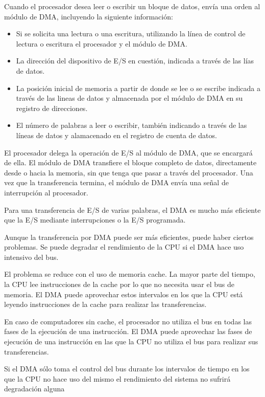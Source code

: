 Cuando el procesador desea leer o escribir un bloque de datos, envía una orden al módulo de DMA, incluyendo la siguiente información:

\begin{itemize}
  \item Si se solicita una lectura o una escritura, utilizando la línea de control de lectura o escritura el procesador y el módulo de DMA.\@
  \item La dirección del dispositivo de E/S en cuestión, indicada a través de las lías de datos.
  \item La posición inicial de memoria a partir de donde se lee o se escribe indicada a través de las lineas de datos y almacenada por el módulo de DMA en su registro de direcciones.
  \item El número de palabras a leer o escribir, también indicando a través de las líneas de datos y alamacenado en el registro de cuenta de datos.
\end{itemize}

El procesador delega la operación de E/S al módulo de DMA, que se encargará de ella. El módulo de DMA transfiere el bloque completo de datos, directamente desde o hacia la memoria, sin que tenga que pasar a través del procesador. Una vez que la transferencia termina, el módulo de DMA envía una señal de interrupción al procesador.

Para una transferencia de E/S de varias palabras, el DMA es mucho más eficiente que la E/S mediante interrupciones o la E/S programada.

Aunque la transferencia por DMA puede ser más eficientes, puede haber ciertos problemas. Se puede degradar el rendimiento de la CPU si el DMA hace uso intensivo del bus.

El problema se reduce con el uso de memoria cache. La mayor parte del tiempo, la CPU lee instrucciones de la cache por lo que no necesita usar el bus de memoria. El DMA puede aprovechar estos intervalos en los que la CPU está leyendo instrucciones de la cache para realizar las transferencias.

En caso de computadores sin cache, el procesador no utiliza el bus en todas las fases de la ejecución de una instrucción. El DMA puede aprovechar las fases de ejecución de una instrucción en las que la CPU no utiliza el bus para realizar sus transferencias.

Si el DMA sólo toma el control del bus durante los intervalos de tiempo en los que la CPU no hace uso del mismo el rendimiento del sistema no sufrirá degradación alguna

